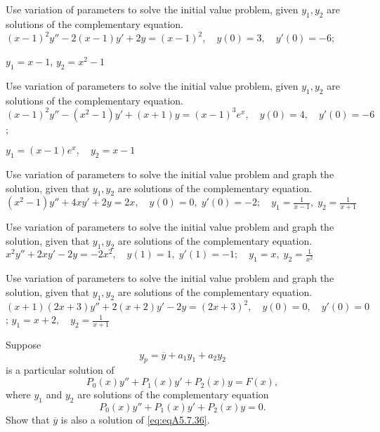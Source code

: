 \documentclass{ximera}
\begin{document}
\begin{problem}\label{exer:5.7.31}
Use variation
of parameters to solve the initial value problem, given
$y_1,y_2$ are solutions of the complementary equation. $(x-1)^2y''-2(x-1)y'+2y=(x-1)^2, \quad   y(0)=3,\quad   y'(0)=-6$;

$y_1=x-1$,\;
$y_2=x^2-1$
\end{problem}

\begin{problem}\label{exer:5.7.32}
Use variation
of parameters to solve the initial value problem, given
$y_1,y_2$ are solutions of the complementary equation. $(x-1)^2y''-(x^2-1)y'+(x+1)y=(x-1)^3e^x, \quad  y(0)=4,\quad y'(0)=-6$;

$y_1=(x-1)e^x,\quad y_2=x-1$
\end{problem}

\begin{problem}\label{exer:5.7.33} Use variation
of parameters to solve the initial value problem and graph the
solution, given that $y_1,y_2$ are solutions of the complementary
equation.
$(x^2-1)y''+4xy'+2y=2x, \quad   y(0)=0,\;  y'(0)
=-2; \quad   y_1=\frac{1}{x-1},\;  y_2=\frac{1}{x+1}$
\end{problem}

\begin{problem}\label{exer:5.7.34} Use variation
of parameters to solve the initial value problem and graph the
solution, given that $y_1,y_2$ are solutions of the complementary
equation.
$x^2y''+2xy'-2y=-2x^2, \quad   y(1)=1,\;  y'(1)=
-1; \quad  y_1=x,\;  y_2=\frac{1}{x^2}$
\end{problem}

\begin{problem}\label{exer:5.7.35} Use variation
of parameters to solve the initial value problem and graph the
solution, given that $y_1,y_2$ are solutions of the complementary
equation.
$(x+1)(2x+3)y''+2(x+2)y'-2y=(2x+3)^2, \quad  y(0)=0,\quad y'(0)=0$;
\newline $y_1=x+2,\quad y_2=\frac{1}{x+1}$
\end{problem}

\begin{problem}\label{exer:5.7.36}
Suppose
$$
y_p=\overline y+a_1y_1+a_2y_2
$$
is a particular solution of \begin{equation}\label{eq:eqA5.7.36}
P_0(x)y''+P_1(x)y'+P_2(x)y=F(x),
\end{equation}
where  $y_1$  and $y_2$ are  solutions of the complementary equation
$$
P_0(x)y''+P_1(x)y'+P_2(x)y=0.
$$
Show that $\overline y$  is also a solution of \ref{eq:eqA5.7.36}.
\end{problem}
\end{document}
